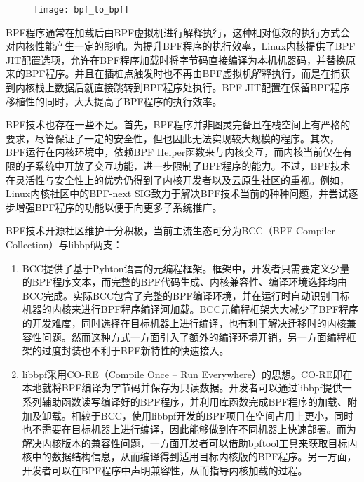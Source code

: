 \begin{figure}[!htbp]
    \centering
    \texttt{[image: bpf\_to\_bpf]}
    \label{fig:bpf_to_bpf}
\end{figure}

BPF程序通常在加载后由BPF虚拟机进行解释执行，这种相对低效的执行方式会对内核性能产生一定的影响。为提升BPF程序的执行效率，Linux内核提供了BPF JIT配置选项，允许在BPF程序加载时将字节码直接编译为本机机器码，并替换原来的BPF程序。并且在插桩点触发时也不再由BPF虚拟机解释执行，而是在捕获到内核栈上数据后就直接跳转到BPF程序处执行。BPF JIT配置在保留BPF程序移植性的同时，大大提高了BPF程序的执行效率。

BPF技术也存在一些不足。首先，BPF程序并非图灵完备且在栈空间上有严格的要求，尽管保证了一定的安全性，但也因此无法实现较大规模的程序。其次，BPF运行在内核环境中，依赖BPF Helper函数来与内核交互，而内核当前仅在有限的子系统中开放了交互功能，进一步限制了BPF程序的能力。不过，BPF技术在灵活性与安全性上的优势仍得到了内核开发者以及云原生社区的重视。例如，Linux内核社区中的BPF-next SIG致力于解决BPF技术当前的种种问题，并尝试逐步增强BPF程序的功能以便于向更多子系统推广。

BPF技术开源社区维护十分积极，当前主流生态可分为BCC（BPF Compiler Collection）\citep{bcc}与libbpf\citep{libbpf}两支：

\begin{enumerate}
    \item BCC提供了基于Pyhton语言的元编程框架。框架中，开发者只需要定义少量的BPF程序文本，而完整的BPF代码生成、内核兼容性、编译环境选择均由BCC完成。实际BCC包含了完整的BPF编译环境，并在运行时自动识别目标机器的内核来进行BPF程序编译河加载。BCC元编程框架大大减少了BPF程序的开发难度，同时选择在目标机器上进行编译，也有利于解决迁移时的内核兼容性问题。然而这种方式一方面引入了额外的编译环境开销，另一方面编程框架的过度封装也不利于BPF新特性的快速接入。
    \item libbpf采用CO-RE（Compile Once – Run Everywhere）的思想。CO-RE即在本地就将BPF编译为字节码并保存为只读数据。开发者可以通过libbpf提供一系列辅助函数读写编译好的BPF程序，并利用库函数完成BPF程序的加载、附加及卸载。相较于BCC，使用libbpf开发的BPF项目在空间占用上更小，同时也不需要在目标机器上进行编译，因此能够做到在不同机器上快速部署。而为解决内核版本的兼容性问题，一方面开发者可以借助bpftool工具来获取目标内核中的数据结构信息，从而编译得到适用目标内核版的BPF程序。另一方面，开发者可以在BPF程序中声明兼容性，从而指导内核加载的过程。
\end{enumerate}

